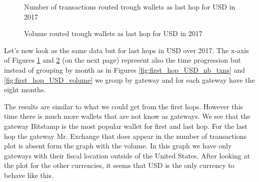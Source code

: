 \begin{figure}[h!]
  \caption{Number of transactions routed trough wallets as last hop for USD in 2017}
  \label{fig:last_hop_USD_nb_txns}
\end{figure}

\begin{figure}[h!]
  \caption{Volume routed trough wallets as last hop for USD in 2017}
  \label{fig:last_hop_USD_volume}
\end{figure}
Let's now look as the same data but for last hops in USD over 2017. The x-axis of Figures \ref{fig:last_hop_USD_nb_txns} and \ref{fig:last_hop_USD_volume} (on the next page) represent also the time progression but instead of grouping by month as in Figures \ref{fig:first_hop_USD_nb_txns} and \ref{fig:first_hop_USD_volume} we group by gateway and for each gateway have the eight months. 

The results are similar to what we could get from the first hops. However this time there is much more wallets that are not know as gateways. We see that the gateway Bitstamp is the most popular wallet for first and last hop. For the last hop the gateway Mr. Exchange that does appear in the number of transactions plot is absent form the graph with the volume. In this graph we have only gateways with their fiscal location outside of the United States. After looking at the plot for the other currencies, it seems that USD is the only currency to behave like this.
\vspace{\baselineskip}

